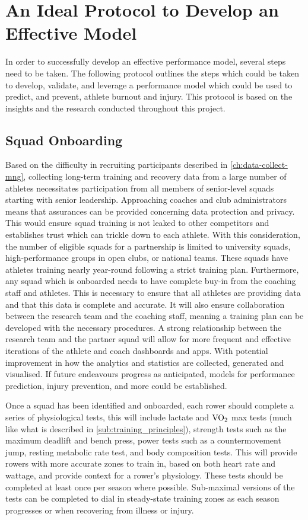 \section{\label{sec:model-devel-prot}An Ideal Protocol to Develop an Effective Model}
In order to successfully develop an effective performance model, several steps need to be taken. The following protocol outlines the steps which could be taken to develop, validate, and leverage a performance model which could be used to predict, and prevent, athlete burnout and injury. This protocol is based on the insights and the research conducted throughout this project.

\subsection{\label{sub:ideal-onboard}Squad Onboarding}
Based on the difficulty in recruiting participants described in \autoref{ch:data-collect-mng}, collecting long-term training and recovery data from a large number of athletes necessitates participation from all members of senior-level squads starting with senior leadership. Approaching coaches and club administrators means that assurances can be provided concerning data protection and privacy. This would ensure squad training is not leaked to other competitors and establishes trust which can trickle down to each athlete. With this consideration, the number of eligible squads for a partnership is limited to university squads, high-performance groups in open clubs, or national teams. These squads have athletes training nearly year-round following a strict training plan. Furthermore, any squad which is onboarded needs to have complete buy-in from the coaching staff and athletes. This is necessary to ensure that all athletes are providing data and that this data is complete and accurate. It will also ensure collaboration between the research team and the coaching staff, meaning a training plan can be developed with the necessary procedures. A strong relationship between the research team and the partner squad will allow for more frequent and effective iterations of the athlete and coach dashboards and apps. With potential improvement in how the analytics and statistics are collected, generated and visualised. If future endeavours progress as anticipated, models for performance prediction, injury prevention, and more could be established.

Once a squad has been identified and onboarded, each rower should complete a series of physiological tests, this will include lactate and $\textnormal{VO}_2$ max tests (much like what is described in \autoref{sub:training_principles}), strength tests such as the maximum deadlift and bench press, power tests such as a countermovement jump, resting metabolic rate test, and body composition tests. This will provide rowers with more accurate zones to train in, based on both heart rate and wattage, and provide context for a rower's physiology. These tests should be completed at least once per season where possible. Sub-maximal versions of the tests can be completed to dial in steady-state training zones as each season progresses or when recovering from illness or injury.

